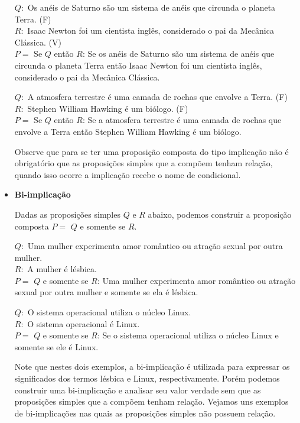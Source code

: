 \begin{itemize}
 \begin{exem} \label{(Se 3)}
 $Q:$ Os anéis de Saturno são um sistema de anéis que circunda o planeta Terra. (F) \\
 $R:$ Isaac Newton foi um cientista inglês, considerado o pai da Mecânica Clássica. (V) \\
 $P=$ Se $Q$ então $R$: Se os anéis de Saturno são um sistema de anéis que circunda o planeta Terra então Isaac Newton foi um cientista inglês, considerado o pai da Mecânica Clássica.
 \end{exem}
 
 \begin{exem} \label{(Se 4)}
 $Q:$ A atmosfera terrestre é uma camada de rochas que envolve a Terra. (F) \\
 $R:$ Stephen William Hawking é um biólogo. (F) \\
 $P=$ Se $Q$ então $R$: Se a atmosfera terrestre é uma camada de rochas que envolve a Terra então Stephen William Hawking é um biólogo. 
 \end{exem}
 
 
 Observe que para se ter uma proposição composta do tipo implicação não é obrigatório que as proposições simples que a compõem tenham relação, quando isso ocorre a implicação recebe o nome de condicional.
 
 \item \textbf{Bi-implicação}
 
 Dadas as proposições simples $Q$ e $R$ abaixo, podemos construir a proposição composta $P=$ $Q$ e somente se $R$.
 
  \begin{exem} \label{(Def 1)}
  $Q:$ Uma mulher experimenta amor romântico ou atração sexual por outra mulher.\\
 $R:$ A mulher é lésbica. \\
 $P=$ $Q$ e somente se $R$: Uma mulher experimenta amor romântico ou atração sexual por outra mulher e somente se ela é lésbica.
 \end{exem}
 
 \begin{exem} \label{(Def 2)}
 $Q:$ O sistema operacional utiliza o núcleo Linux. \\
 $R:$ O sistema operacional é Linux. \\
 $P=$ $Q$ e somente se $R$: Se o sistema operacional utiliza o núcleo Linux e somente se ele é Linux.
 \end{exem}
 
 Note que nestes dois exemplos, a bi-implicação é utilizada para expressar os significados dos termos lésbica e Linux, respectivamente. Porém podemos construir uma bi-implicação e analisar seu valor verdade sem que as proposições simples que a compõem tenham relação. Vejamos uns exemplos de bi-implicações nas quais as proposições simples não possuem relação.
 

\end{itemize}
